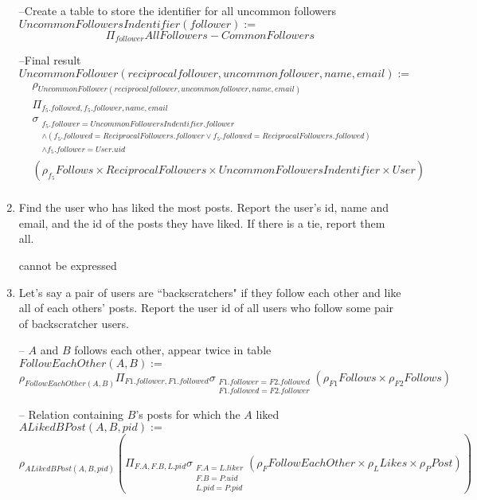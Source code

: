 \documentclass{article}
\newcommand{\var}[1]{\mathit{#1}}
\begin{document}
\begin{enumerate}
{--Create a table to store the identifier for all uncommon followers \\
$\var{UncommonFollowersIndentifier}(follower) := $
\[
	\Pi_{follower} \var{AllFollowers} - \var{CommonFollowers}
\]

--Final result \\
$\var{UncommonFollower}(reciprocalfollower, uncommon follower, name, email):=$
\begin{align*}
    &\rho_{\var{UncommonFollower}(reciprocalfollower, uncommon follower, name, email)}\\
	&\Pi_{f_5.followed,f_5.follower,name,email}\\
		&\sigma_{
			\substack{
				f_5.follower = UncommonFollowersIndentifier.follower \\
				\land (f_5.followed = ReciprocalFollowers.follower \lor f_5.followed = ReciprocalFollowers.followed)\\
				\land f_5.follower = User.uid
			}
		}\\
		&(\rho_{f_5} \var{Follows} \times \var{ReciprocalFollowers} \times \var{UncommonFollowersIndentifier} \times \var{User})\\
\end{align*}

}

\item   %
Find the user who has liked the most posts. 
Report the user's id, name and email, and the id of the posts they have liked. 
If there is a tie, report them all.

cannot be expressed

\item   %
Let's say a pair of users are ``backscratchers" 
if they follow each other and like all of each others' posts. 
Report the user id of all users who follow some pair of backscratcher users.

{\large 

-- $A$ and $B$ follows each other, appear twice in table  \\ 
$\var{FollowEachOther}(A,B) :=$
\[
    \rho_{\var{FollowEachOther}(A,B)}
    \Pi_{F1.follower, F1.followed}
    \sigma_{
        \substack{
            F1.follower=F2.followed\\
            F1.followed=F2.follower
        }
    } \left( \rho_{F1} \var{Follows} \times \rho_{F2} \var{Follows} \right)
\]


-- Relation containing $B$'s posts for which the $A$ liked  \\ 
$\var{ALikedBPost}(A,B,pid) :=$
\[
    \rho_{ALikedBPost(A,B,pid)}
    \left(
        \Pi_{F.A, F.B, L.pid}
        \sigma_{
            \substack{  
                F.A=L.liker\\
                F.B=P.uid \\
                L.pid=P.pid
            }
        }
        (\rho_{F} \var{FollowEachOther} \times \rho_{L} \var{Likes}\times \rho_{P} \var{Post})
    \right)
\]

}
\end{enumerate}
\end{document}
